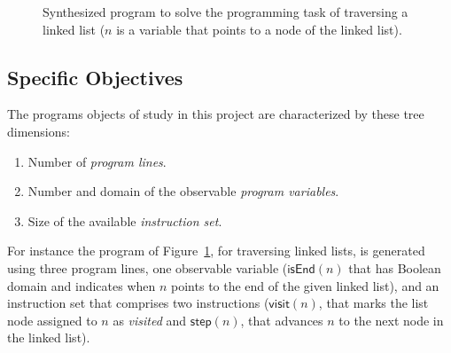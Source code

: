 \documentclass[10pt,a4paper]{paper}
\begin{document}
\begin{figure}[hbt!]
\begin{center}
\end{center}
\caption{\small Synthesized program to solve the programming task of traversing a linked list ($n$ is a variable that points to a node of the linked list).}
\label{fig:list}
\end{figure}



\subsection{Specific Objectives}
\label{sec:objectivos}

The programs objects of study in this project are characterized by these tree dimensions:
\begin{enumerate}
\item Number of {\em program lines}.
\item Number and domain of the observable {\em program variables}.
\item Size of the available {\em instruction set}.
\end{enumerate}  

For instance the program of Figure~\ref{fig:list}, for traversing linked lists, is generated using three program lines, one observable variable ($\mathsf{isEnd}(n)$ that has Boolean domain and indicates when $n$ points to the end of the given linked list), and an instruction set that comprises two instructions ($\mathsf{visit}(n)$, that marks the list node assigned to $n$ as {\em visited} and $\mathsf{step}(n)$, that advances $n$ to the next node in the linked list).
\end{document}
